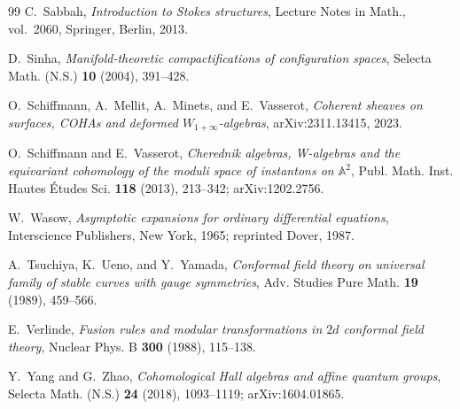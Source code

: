 \documentclass[11pt,reqno]{amsart}
\theoremstyle{definition}
\theoremstyle{remark}
\numberwithin{equation}{section}
\begin{document}
\begin{thebibliography}{99}
C.~Sabbah,
\emph{Introduction to Stokes structures},
Lecture Notes in Math., vol.~2060, Springer, Berlin, 2013.

D.~Sinha,
\emph{Manifold-theoretic compactifications of configuration
spaces},
Selecta Math. (N.S.) \textbf{10} (2004), 391--428.

O.~Schiffmann, A.~Mellit, A.~Minets, and E.~Vasserot,
\emph{Coherent sheaves on surfaces, COHAs and deformed
$W_{1+\infty}$-algebras},
arXiv:2311.13415, 2023.

O.~Schiffmann and E.~Vasserot,
\emph{Cherednik algebras, W-algebras and the equivariant
cohomology of the moduli space of instantons on
$\mathbb{A}^2$},
Publ. Math. Inst. Hautes \'Etudes Sci. \textbf{118}
(2013), 213--342; arXiv:1202.2756.

W.~Wasow,
\emph{Asymptotic expansions for ordinary differential
equations},
Interscience Publishers, New York, 1965;
reprinted Dover, 1987.

A.~Tsuchiya, K.~Ueno, and Y.~Yamada,
\emph{Conformal field theory on universal family of stable
curves with gauge symmetries},
Adv. Studies Pure Math. \textbf{19} (1989), 459--566.

E.~Verlinde,
\emph{Fusion rules and modular transformations in $2d$
conformal field theory},
Nuclear Phys. B \textbf{300} (1988), 115--138.

Y.~Yang and G.~Zhao,
\emph{Cohomological Hall algebras and affine quantum
groups},
Selecta Math. (N.S.) \textbf{24} (2018), 1093--1119;
arXiv:1604.01865.

\end{thebibliography}
\end{document}
